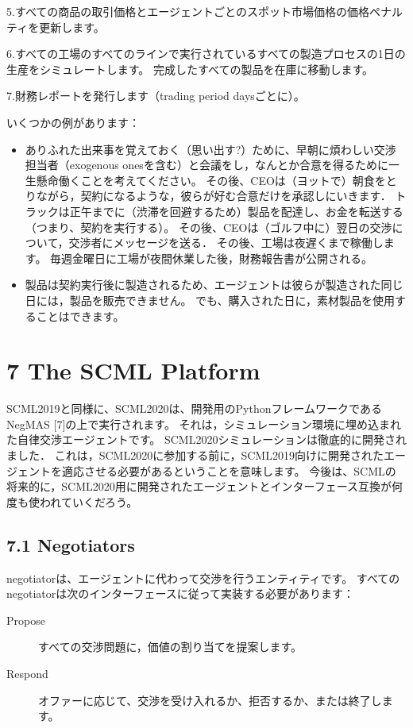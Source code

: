 \documentclass[12pt]{jarticle}
\begin{document}
5.すべての商品の取引価格とエージェントごとのスポット市場価格の価格ペナルティを更新します。

6.すべての工場のすべてのラインで実行されているすべての製造プロセスの1日の生産をシミュレートします。
完成したすべての製品を在庫に移動します。

7.財務レポートを発行します（trading period daysごとに）。


いくつかの例があります：

\begin{itemize}
\item ありふれた出来事を覚えておく（思い出す?）ために、早朝に煩わしい交渉担当者（exogenous onesを含む）と会議をし，なんとか合意を得るために一生懸命働くことを考えてください。
その後、CEOは（ヨットで）朝食をとりながら，契約になるような，彼らが好む合意だけを承認しにいきます．
トラックは正午までに（渋滞を回避するため）製品を配達し、お金を転送する（つまり、契約を実行する）。
その後、CEOは（ゴルフ中に）翌日の交渉について，交渉者にメッセージを送る．
その後、工場は夜遅くまで稼働します。
毎週金曜日に工場が夜間休業した後，財務報告書が公開される。

\item 製品は契約実行後に製造されるため、エージェントは彼らが製造された同じ日には，製品を販売できません。
でも、購入された日に，素材製品を使用することはできます。
\end{itemize}


\section{7 The SCML Platform}
SCML2019と同様に、SCML2020は、開発用のPythonフレームワークであるNegMAS [7]の上で実行されます。
それは，シミュレーション環境に埋め込まれた自律交渉エージェントです。
SCML2020シミュレーションは徹底的に開発されました．
これは，SCML2020に参加する前に，SCML2019向けに開発されたエージェントを適応させる必要があるということを意味します。
今後は、SCMLの将来的に，SCML2020用に開発されたエージェントとインターフェース互換が何度も使われていくだろう。

\subsection{7.1 Negotiators}
negotiatorは、エージェントに代わって交渉を行うエンティティです。
すべてのnegotiatorは次のインターフェースに従って実装する必要があります：

\begin{description}
  \item[Propose]すべての交渉問題に，価値の割り当てを提案します。
  \item[Respond]オファーに応じて、交渉を受け入れるか、拒否するか、または終了します。
\end{description} 
\end{document}

